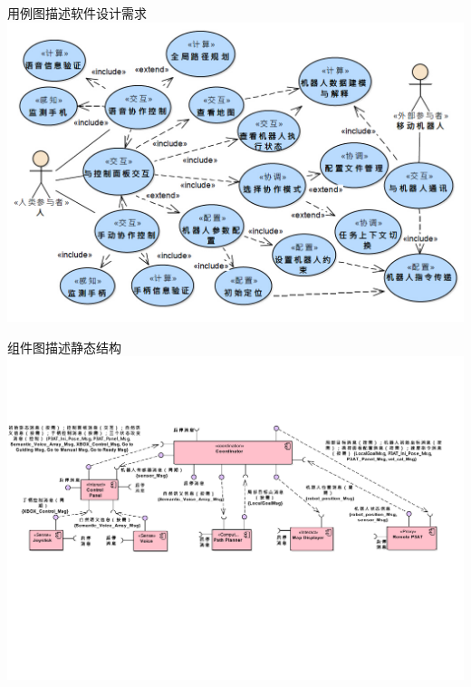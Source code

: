 \documentclass{beamer}
\begin{document}
\begin{frame}[t]{用例图描述软件设计需求}
    \includegraphics[scale=0.4]{./resource/graph/4.jpg}
\end{frame}
\begin{frame}[t]{组件图描述静态结构}
    \includegraphics[scale=0.38]{./resource/graph/5.pdf}
\end{frame}
\end{document}
